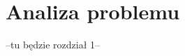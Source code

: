 \chapter{Analiza problemu}
\thispagestyle{chapterBeginStyle}
\label{rozdzial1}

--tu będzie rozdział 1--
